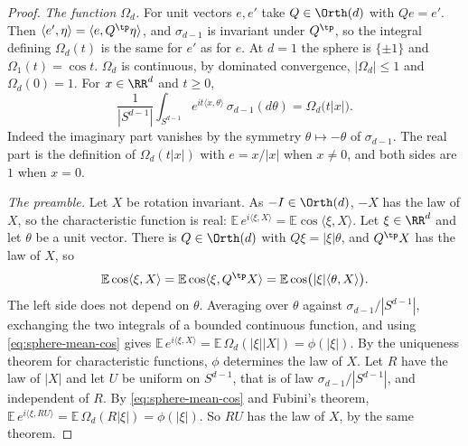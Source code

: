 \begin{proof}
\emph{The function $\Omega_d$.} For unit vectors $e, e'$ take $Q \in \Orth(d)$ with $Qe = e'$.
Then $\langle e',\eta\rangle = \langle e,Q^{\tp}\eta\rangle$, and $\sigma_{d-1}$ is invariant
under $Q^{\tp}$, so the integral defining $\Omega_d(t)$ is the same for $e'$ as for $e$. At
$d = 1$ the sphere is $\{\pm1\}$ and $\Omega_1(t) = \cos t$. $\Omega_d$ is continuous, by
dominated convergence, $|\Omega_d| \le 1$ and $\Omega_d(0) = 1$. For $x \in \RR^d$ and $t \ge 0$,
\begin{equation}\label{eq:sphere-mean-cos}
  \frac{1}{|S^{d-1}|}\int_{S^{d-1}}e^{it\langle x,\theta\rangle}\,\sigma_{d-1}(d\theta)
   = \Omega_d\bigl(t|x|\bigr) .
\end{equation}
Indeed the imaginary part vanishes by the symmetry $\theta \mapsto -\theta$ of $\sigma_{d-1}$.
The real part is the definition of $\Omega_d(t|x|)$ with $e = x/|x|$ when $x \ne 0$, and both
sides are $1$ when $x = 0$.

\emph{The preamble.} Let $X$ be rotation invariant. As $-I \in \Orth(d)$, $-X$ has the law of
$X$, so the characteristic function is real:
$\mathbb{E}\,e^{i\langle\xi,X\rangle} = \mathbb{E}\cos\langle\xi,X\rangle$. Let $\xi \in \RR^d$
and let $\theta$ be a unit vector. There is $Q \in \Orth(d)$ with $Q\xi = |\xi|\theta$, and
$Q^{\tp}X$ has the law of $X$, so
\[
  \mathbb{E}\cos\langle\xi,X\rangle = \mathbb{E}\cos\langle\xi,Q^{\tp}X\rangle
   = \mathbb{E}\cos\bigl(|\xi|\langle\theta,X\rangle\bigr) .
\]
The left side does not depend on $\theta$. Averaging over $\theta$ against
$\sigma_{d-1}/|S^{d-1}|$, exchanging the two integrals of a bounded continuous function, and using
\ref{eq:sphere-mean-cos} gives
$\mathbb{E}\,e^{i\langle\xi,X\rangle} = \mathbb{E}\,\Omega_d(|\xi||X|) = \phi(|\xi|)$. By the
uniqueness theorem for characteristic functions, $\phi$ determines the law of $X$. Let $R$ have
the law of $|X|$ and let $U$ be uniform on $S^{d-1}$, that is of law $\sigma_{d-1}/|S^{d-1}|$,
and independent of $R$. By \ref{eq:sphere-mean-cos} and Fubini's theorem,
$\mathbb{E}\,e^{i\langle\xi,RU\rangle} = \mathbb{E}\,\Omega_d(R|\xi|) = \phi(|\xi|)$. So $RU$ has
the law of $X$, by the same theorem.


\end{proof}
